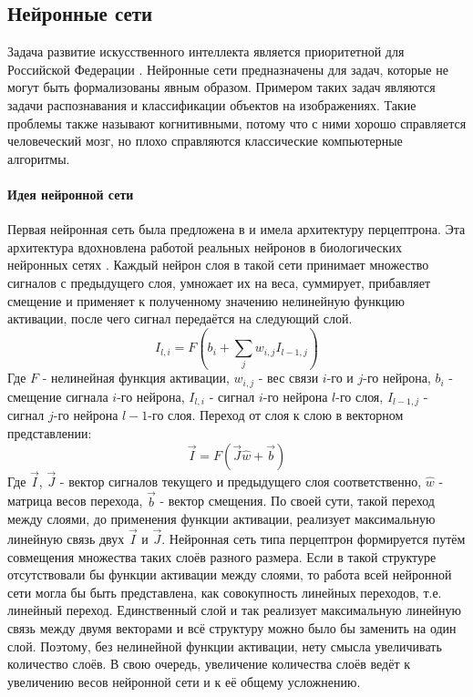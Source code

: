 \subsection{Нейронные сети}
Задача развитие искусственного интеллекта является приоритетной для Российской Федерации \cite{Russia}. Нейронные сети предназначены для задач, которые не могут быть формализованы явным образом. Примером таких задач являются задачи распознавания и классификации объектов на изображениях. Такие проблемы также называют когнитивными, потому что с ними хорошо справляется человеческий мозг, но плохо справляются классические компьютерные алгоритмы.

\paragraph{Идея нейронной сети}
Первая нейронная сеть была предложена в \cite{rosenblatt1958perceptron} и имела архитектуру перцептрона. Эта архитектура вдохновлена работой реальных нейронов в биологических нейронных сетях \cite{block1962perceptron}. Каждый нейрон слоя в такой сети принимает множество сигналов с предыдущего слоя, умножает их на веса, суммирует, прибавляет смещение и применяет к полученному значению нелинейную функцию активации, после чего сигнал передаётся на следующий слой.
\begin{equation}\label{eq:per1}
	I_{l,i}=F\left(b_i+\sum\limits_{j}{w_{i,j}I_{l-1,j}}\right)
\end{equation}
Где $F$ - нелинейная функция активации, $w_{i,j}$ - вес связи $i$-го и $j$-го нейрона, $b_i$ - смещение сигнала $i$-го нейрона, $I_{l,i}$ - сигнал $i$-го нейрона $l$-го слоя, $I_{l-1,j}$ - сигнал $j$-го нейрона $l-1$-го слоя. Переход от слоя к слою в векторном представлении:
\begin{equation}\label{eq:per2}
	\vec{I} = F\left(\vec{J}\hat{w} + \vec{b}\right)
\end{equation}
Где $\vec{I}$, $\vec{J}$ - вектор сигналов текущего и предыдущего слоя соответственно, $\hat{w}$ - матрица весов перехода, $\vec{b}$ - вектор смещения. По своей сути, такой переход между слоями, до применения функции активации, реализует максимальную линейную связь двух $\vec{I}$ и $\vec{J}$. Нейронная сеть типа перцептрон формируется путём совмещения множества таких слоёв разного размера. Если в такой структуре отсутствовали бы функции активации между слоями, то работа всей нейронной сети могла бы быть представлена, как совокупность линейных переходов, т.е. линейный переход. Единственный слой и так реализует максимальную линейную связь между двумя векторами и всё структуру можно было бы заменить на один слой. Поэтому, без нелинейной функции активации, нету смысла увеличивать количество слоёв. В свою очередь, увеличение количества слоёв ведёт к увеличению весов нейронной сети и к её общему усложнению.
